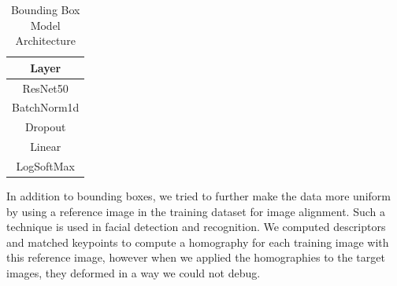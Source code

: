 \begin{table}[h!]
	\centering
	\begin{tabular}{|c|}\hline
		\textbf{Layer}\\ \hline
		ResNet50 \\\hline
		BatchNorm1d \\ \hline
		Dropout \\ \hline
		Linear \\ \hline
		LogSoftMax \\ \hline
	\end{tabular}
	\caption{\label{tab:bbres} Bounding Box Model Architecture}
\end{table}

In addition to bounding boxes, we tried to further make the data more uniform by using a reference image in the training dataset for image alignment. Such a technique is used in facial detection and recognition. We computed descriptors and matched keypoints to compute a homography for each training image with this reference image, however when we applied the homographies to the target images, they deformed in a way we could not debug. 